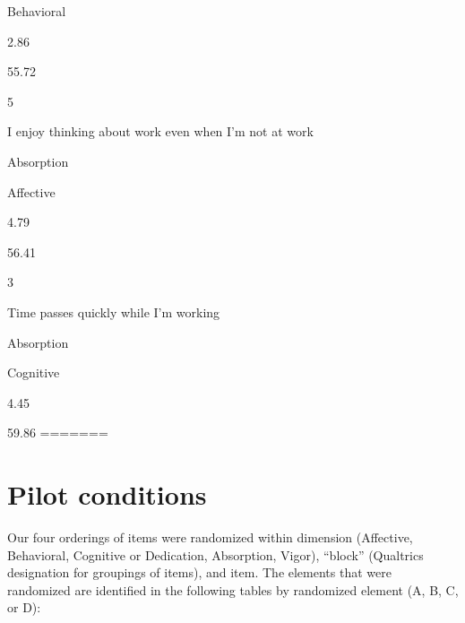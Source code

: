 \documentclass[
]{book}
\begin{document}
Behavioral

2.86

55.72

5

I enjoy thinking about work even when I'm not at work

Absorption

Affective

4.79

56.41

3

Time passes quickly while I'm working

Absorption

Cognitive

4.45

59.86
=======

\hypertarget{pilot2}{%
\chapter{Pilot conditions}\label{pilot2}}

Our four orderings of items were randomized within dimension (Affective, Behavioral, Cognitive or Dedication, Absorption, Vigor), ``block'' (Qualtrics designation for groupings of items), and item. The elements that were randomized are identified in the following tables by randomized element (A, B, C, or D):
\end{document}
